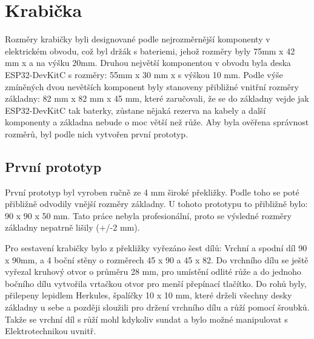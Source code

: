 \chapter{Krabička}
Rozměry krabičky byli designované podle nejrozměrnější komponenty v elektrickém obvodu, což byl držák s bateriemi, jehož rozměry byly 75mm x 42 mm x a na výšku 20mm. Druhou největší komponentou v obvodu byla deska ESP32-DevKitC s rozměry: 55mm x 30 mm x s výškou 10 mm.
Podle výše zmíněných dvou nevětších komponent byly stanoveny přibližné vnitřní rozměry základny: 82 mm x 82 mm x 45 mm, které zaručovali, že se do základny vejde jak ESP32-DevKitC tak baterky, zůstane nějaká rezerva na kabely a další komponenty a základna nebude o moc větší než růže.  
Aby byla ověřena správnost rozměrů, byl podle nich vytvořen první prototyp.



\section{První prototyp}
První prototyp byl vyroben ručně ze 4 mm široké překližky. Podle toho se poté přibližně odvodily vnější rozměry základny. U tohoto prototypu to přibližně bylo: 90 x 90 x 50 mm. Tato práce nebyla profesionální, proto se výsledné rozměry základny nepatrně lišily (+/-2 mm).

Pro sestavení krabičky bylo z překližky vyřezáno šest dílů: Vrchní a spodní díl 90 x 90mm, a 4 boční stěny o rozměrech 45 x 90 a 45 x 82. Do vrchního dílu se ještě vyřezal kruhový otvor o průměru 28 mm, pro umístění odlité růže a do jednoho bočního dílu vytvořila vrtačkou otvor pro menší přepínací tlačítko. Do rohů byly, přilepeny lepidlem Herkules, špalíčky 10 x 10 mm, které drželi všechny desky základny u sebe a později sloužili pro držení vrchního dílu a růží pomocí šroubků. Takže se vrchní díl s růží mohl kdykoliv sundat a bylo možné manipulovat s Elektrotechnikou uvnitř.

